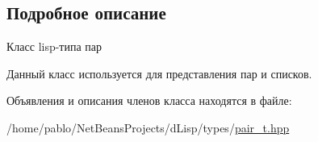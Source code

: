 \subsection{Подробное описание}
Класс lisp-\/типа пар 

Данный класс используется для представления пар и списков. 

Объявления и описания членов класса находятся в файле\+:\begin{DoxyCompactItemize}
\item 
/home/pablo/\+Net\+Beans\+Projects/d\+Lisp/types/\mbox{\hyperlink{pair__t_8hpp}{pair\+\_\+t.\+hpp}}\end{DoxyCompactItemize}
